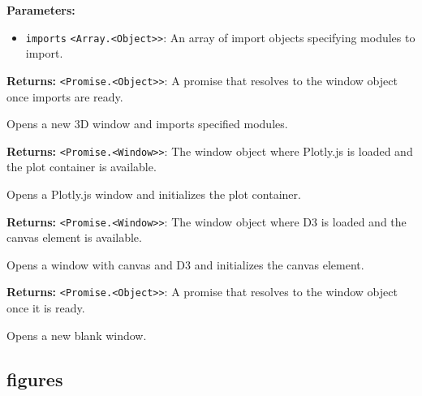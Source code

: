 \documentclass[12pt,a4paper]{article}
\begin{document}
\noindent \textbf{Parameters:}
\begin{itemize}
  \item \texttt{imports} \texttt{<Array.<Object>>}: An array of import objects specifying modules to import.
\end{itemize}

\noindent \textbf{Returns:} \texttt{<Promise.<Object>>}: A promise that resolves to the window object once imports are ready.

\noindent Opens a new 3D window and imports specified modules.

\vspace{5mm}
\noindent {}


\noindent \textbf{Returns:} \texttt{<Promise.<Window>>}: The window object where Plotly.js is loaded and the plot container is available.

\noindent Opens a Plotly.js window and initializes the plot container.

\vspace{5mm}
\noindent {}


\noindent \textbf{Returns:} \texttt{<Promise.<Window>>}: The window object where D3 is loaded and the canvas element is available.

\noindent Opens a window with canvas and D3 and initializes the canvas element.

\vspace{5mm}
\noindent {}


\noindent \textbf{Returns:} \texttt{<Promise.<Object>>}: A promise that resolves to the window object once it is ready.

\noindent Opens a new blank window.


\subsection{figures}
\vspace{5mm}
\noindent {}\vspace{4mm}
\end{document}
